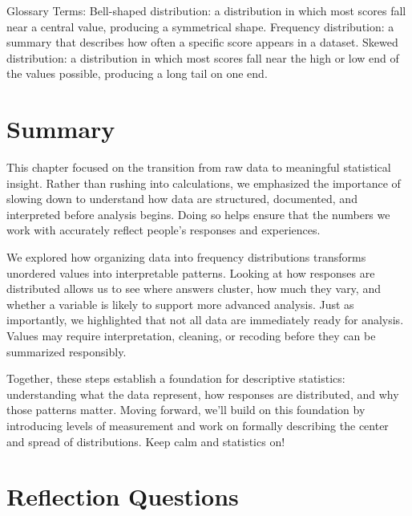 \documentclass[
  letterpaper,
  DIV=11,
  numbers=noendperiod]{scrreprt}
\begin{document}
Glossary Terms: Bell-shaped distribution: a distribution in which most
scores fall near a central value, producing a symmetrical shape.
Frequency distribution: a summary that describes how often a specific
score appears in a dataset. Skewed distribution: a distribution in which
most scores fall near the high or low end of the values possible,
producing a long tail on one end.

\section{Summary}\label{summary}

This chapter focused on the transition from raw data to meaningful
statistical insight. Rather than rushing into calculations, we
emphasized the importance of slowing down to understand how data are
structured, documented, and interpreted before analysis begins. Doing so
helps ensure that the numbers we work with accurately reflect people's
responses and experiences.

We explored how organizing data into frequency distributions transforms
unordered values into interpretable patterns. Looking at how responses
are distributed allows us to see where answers cluster, how much they
vary, and whether a variable is likely to support more advanced
analysis. Just as importantly, we highlighted that not all data are
immediately ready for analysis. Values may require interpretation,
cleaning, or recoding before they can be summarized responsibly.

Together, these steps establish a foundation for descriptive statistics:
understanding what the data represent, how responses are distributed,
and why those patterns matter. Moving forward, we'll build on this
foundation by introducing levels of measurement and work on formally
describing the center and spread of distributions. Keep calm and
statistics on!

\section{Reflection Questions}\label{reflection-questions}
\end{document}
